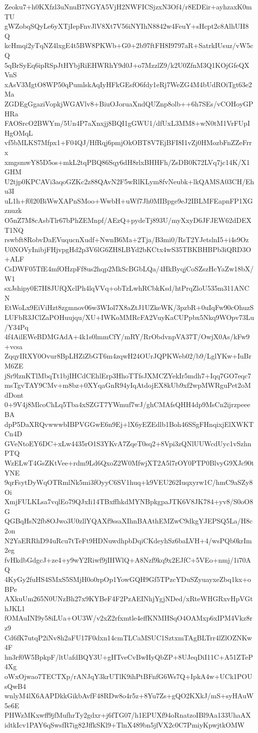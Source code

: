 Zeoku7+h0KXfzl3uNnuB7NGYA5VjH2NWFICSjzxN3Of4/r8EDEir+ayhzaxK0mTU
gWZobqSQyLe6yXTjIepFnvJlV8Xt7V56iNYIhN8842w4FeuY+sHcpt2c8AlhUH8Q
kcHmqi2yTqNZ4lxgE4t5BW8PKWb+G0+2b97ftFH8I9797aR+SatrkIUsuz/vW5cQ
5qBrSyEq6ipRSpJtHYbjRiEHWRhY9d0J+o7MzzlZ9/k2U0ZfnM3Q1KOjGfeQXVnS
xAsV3MgtO8WP50qPumlskAqIyHFkGEsfO6fdy1eRj7WeZG4M4bUdROiTgt63e2Ma
ZGDEgGgaziVopkjWGAVlv8+BiuOJoruaXndQUZnp8olb++6h7SEs/vCOHoyGPHRa
FAOSrcO2BWYm/5Un4P7aXnxjj8BQI1gGWU1/dfUxL3MM8+wN0tM1VrFUpIHgOMqL
vf5bMLKS7Mfpx1+F04QJ/HfRqj6pmjOkOBT8V7EjBFI8I1vZj0HMozbFnZZeFrrx
xmgsmwY85D5os+mkL2tqPBQ86Sqy6dH8rlxBHHFh/ZsDB0K72LVq7jc14K/X1GHM
U2tjp0KPCAVi3aqoGZKc2z88QAvN2F5wRlKLym8fvNeubk+lkQAMSA03CH/Ehu3I
uL1h+f0l20BiWwXAPnSMoo+WwbH+uWf7Jh0MIBpge9eJ2IBLMFEapnFP1XGznuzk
O5nZ7M8cAsbTlr67bPhZEMnpf/AEzQ+pydeTj893U/myXxyD6JFJEW62dDEXT1NQ
rswbft8RobvDaEVuqucnXudf+NwnB6Ma+2Tja/B3mi0/RsT2YJetslnI5+i4s9Oz
U0NOVyInibjFHjvpgHd2p3V6lG6ZH8LBYd2bKCtx4wS35TBKBHBPb3iQRD3O+ALF
CsDWF05TfE4mfOHzpFf8us2hqp2MkScBGbLQa/4HkByqjCoSZszHcYaZw18bX/W1
sxJshipy0E7H8JUfQXclPh4lqVVq+obTzLwhRCbkKsd/htPrqZloU535m311ANCN
EtWoLx9EiViHzt8zgmnov06w3WIol7X8aZtJ1UZkeWK/3pzbR+0uIqFw90cOhuzS
LUFbR3JClZaPOHuujqu/XU+IWKoMMRcFA2VuyKaCUPpbx5Nkq9WOpv73Lu/Y34Pq
4f4AilEWeBDMGAdA+4k1s0lmmCfY/mRY/RrObdvnpVA37T/OwjX0As/kFw9+vcsa
ZqqyIRXY0Ovur8BpLHZiZbGT6m4zqwH24OUrJQPKWeb02/b9/LglYKw+IuBrM6ZE
jSr9lznKTlMbqTt1bjIHCdCEhlErp3HhoTTfsJXMCZYekIr5mdh7+Iqq7GO7eqc7
msTgvTAY9CMv+m8bz+0XYqaGnR94yIqAtdojEX8kUb9xf2wpMWRguPet2oMdDont
0+9V4j8MlcoChLq5Tba4xSZGT7YWmuf7wJ/ghCMAfsQHH4dp9MsCn2ijrzpeeeBA
dpP5DaXRQvwwwbIBPVGGwE6n9Ej+lX6yEZEdlb1Boh46SSgFHnqixjElXWKTCn4D
GVeNtoEY6DC+xLw4435rO1S3YKvA7ZqeT0sq2+8Vpi3zQNlUUWcdUyc1vSzhnPTQ
WzELwT4GsZKtVee+rdm9Ld6QxoZ2W0MfwjXT2A5l7rOY0PTP0BlvyG9XJc90tYNE
9qrFsytDyWqOTRmlNk5mi3fOyyC6SV1huq+k9VEU262Iuqxyrw1C/hmC9aSZy8Oi
XmjFULKLsa7vqlEo79QJxIi14TBxffhkdMYNBpkgpaJTK6V8JK784+yv8/S0oO8G
QGBqHsN2fb8OJwo3U0zllYQAXf9ssaXIhnBAAthEMZwC9dkgYJEPSQ5La/H8c2on
N2YaERRhD94uRcu7tTeFt9HDNuwdhpbDqiCKdeyhSz6baLVH+4/wsPQb0krIm2eg
fvHkdbGdgcJ+ze4+y9wY2Riwf9jIHWlQ+A8Nzf9kq9x2EJfC+5VEo+nmj/1i70AQ
4KyGy2fuHS4SMxS5SMjH0o0rpOp1YowGQH9Gf5TPzcYDuSZyuayxeZbq1kx+oBPe
AXkuUm265N0UNzBh27x9KYBeF4F2PzAEINhjYgjNDed/xRteWHGRxvHpVGthJKL1
fOMAuINI9y58iLUa+OU3W/v2xZ2rfxmtle4effKNMHSqO4OAMxp6xIPM4Vkz8rz9
Cd6fK7utqP2iNv8h2aFU17F0dxn14cmTLCaMSUC1SztxmTAgBLTrr4lZlOZNKw4F
hn3rf0W5BpkpF/ltUafdBQY3U+gHTveCvBwHyQbZP+8UJeqDiI11C+A51ZTeP4Xg
oWxOjwao7TECTXp/rANJqY3krUTlK9ihPtBFnfG6Ws7Q+IpkA4w+UCk1POUsQwB4
wnlyM4lX6AAPDkkGikbAvfF48RDw8o4r5z+8Yu7Zs+gQO2KXkJ/mS+syHAuW5e6E
PHWzMKxwff9jfMufhrTy2gdxr+j6fTG07/h1EPUXf94oRnatzoIBl9Aa133UhaAX
idtkIcv1PAY6qSwsfR7ig82JffkSKl9+TlnX489bn5jfVX2c0C7PmiyKpwjtkOMW
